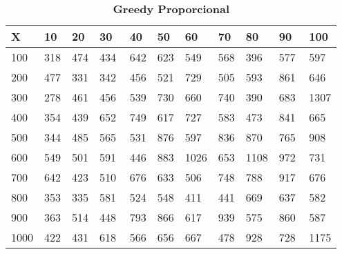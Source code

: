 \documentclass[10pt,letterpaper]{article}
\begin{document}
\begin{center}
\begin{table}\renewcommand{\arraystretch}{2.5}
\caption{\large \textbf{Greedy Proporcional}}
\centering
\begin{tabular} { |m{0.5cm}|m{1.3cm}|m{1.3cm}|m{1.3cm}|m{1.3cm}|m{1.3cm}|m{1.3cm}|m{1.3cm}|m{1.3cm}|m{1.3cm}|m{1.3cm}|} 
\hline
\rowcolor{Gray}
\centering \textbf{X} & \centering \textbf{10} & \centering \textbf{20} & \centering \textbf{30}\ & \centering \textbf{40} & \centering \textbf{50} & \centering \textbf{60}\ & \centering \textbf{70} & \centering \textbf{80} & \centering \textbf{90}\ & \textbf{100} \\\hline
\cellcolor{Gray}100 & \Large 318 & \Large 474 & \Large 434 & \Large 642 & \Large 623 & \Large 549 & \Large 568 & \Large 396 & \Large 577 & \Large 597 \\
\hline
\cellcolor{Gray}200 & \Large 477 & \Large 331 & \Large 342 & \Large 456 & \Large 521 & \Large 729 & \Large 505 & \Large 593 & \Large 861 & \Large 646 \\
\hline
\cellcolor{Gray}300 & \Large 278 & \Large 461 & \Large 456 & \Large 539 & \Large 730 & \Large 660 & \Large 740 & \Large 390 & \Large 683 & \Large 1307 \\
\hline
\cellcolor{Gray}400 & \Large 354 & \Large 439 & \Large 652 & \Large 749 & \Large 617 & \Large 727 & \Large 583 & \Large 473 & \Large 841 & \Large 665 \\
\hline
\cellcolor{Gray}500 & \Large 344 & \Large 485 & \Large 565 & \Large 531 & \Large 876 & \Large 597 & \Large 836 & \Large 870 & \Large 765 & \Large 908 \\
\hline
\cellcolor{Gray}600 & \Large 549 & \Large 501 & \Large 591 & \Large 446 & \Large 883 & \Large 1026 & \Large 653 & \Large 1108 & \Large 972 & \Large 731 \\
\hline
\cellcolor{Gray}700 & \Large 642 & \Large 423 & \Large 510 & \Large 676 & \Large 633 & \Large 506 & \Large 748 & \Large 788 & \Large 917 & \Large 676 \\
\hline
\cellcolor{Gray}800 & \Large 353 & \Large 335 & \Large 581 & \Large 524 & \Large 548 & \Large 411 & \Large 441 & \Large 669 & \Large 637 & \Large 582 \\
\hline
\cellcolor{Gray}900 & \Large 363 & \Large 514 & \Large 448 & \Large 793 & \Large 866 & \Large 617 & \Large 939 & \Large 575 & \Large 860 & \Large 587 \\
\hline
\cellcolor{Gray}1000 & \Large 422 & \Large 431 & \Large 618 & \Large 566 & \Large 656 & \Large 667 & \Large 478 & \Large 928 & \Large 728 & \Large 1175 \\
\hline
\end{tabular} \\
\end{table}
\end{center}
\end{document}
